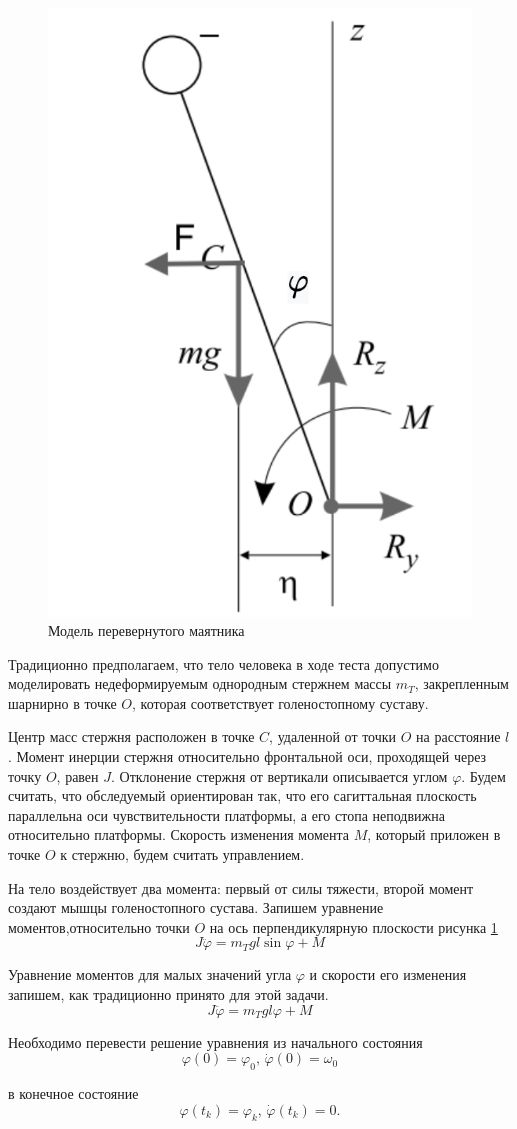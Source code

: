 \documentclass[a4paper,12pt, openany]{book}
\theoremstyle{plain} %
\theoremstyle{definition} %
\theoremstyle{remark} %
\numberwithin{equation}{chapter}
\begin{document}
{\begin{figure}[h!]
    \centering
    \includegraphics[width=0.4\linewidth]{body_1.pdf}
    \caption{Модель перевернутого маятника}
    \label{fig:pendulum}
\end{figure}

Традиционно предполагаем, что тело человека в ходе теста допустимо
моделировать недеформируемым однородным стержнем массы $m_T$,
закрепленным шарнирно в точке $O$, которая соответствует
голеностопному суставу.

Центр масс стержня расположен в точке $C$, удаленной от точки $O$
на расстояние $l$. Момент инерции стержня относительно фронтальной
оси, проходящей через точку $O$, равен $J$. Отклонение стержня от
вертикали описывается углом $\varphi$. Будем считать, что обследуемый
ориентирован так, что его сагиттальная плоскость параллельна оси
чувствительности платформы, а его стопа неподвижна относительно
платформы. Скорость изменения момента $M$, который приложен в точке $O$ к стержню,
будем считать управлением.

На тело воздействует два момента: первый от силы тяжести, второй момент создают мышцы голеностопного сустава.
Запишем уравнение моментов,относительно точки $O$ на ось перпендикулярную плоскости рисунка \ref{fig:pendulum}
\[
    J\ddot{\varphi}= m_Tgl\sin\varphi+M
\]

Уравнение моментов для малых значений угла $\varphi$ и
скорости его изменения запишем, как традиционно принято для этой задачи.
\[
    J\ddot{\varphi}= m_Tgl\varphi+M
\]

Необходимо перевести решение уравнения из начального состояния
\[
    \varphi(0)=\varphi_0, \,\dot{\varphi}(0)=\omega_0
\]

в конечное состояние
\[
    \varphi(t_k)=\varphi_k,\, \dot{\varphi}(t_k)=0.
\]



}
\end{document}
